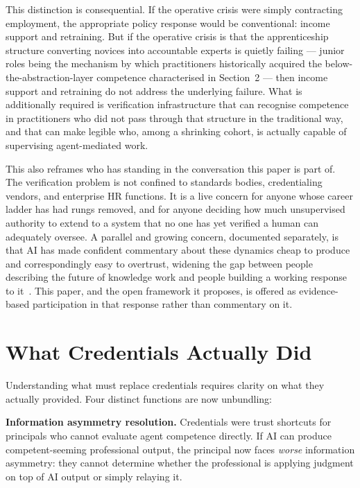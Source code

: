 \documentclass[11pt,a4paper]{article}
\begin{document}
This distinction is consequential. If the operative crisis were simply contracting employment, the
appropriate policy response would be conventional: income support and retraining. But if the
operative crisis is that the apprenticeship structure converting novices into accountable experts is
quietly failing — junior roles being the mechanism by which practitioners historically acquired the
below-the-abstraction-layer competence characterised in Section~2 — then income support and
retraining do not address the underlying failure. What is additionally required is verification
infrastructure that can recognise competence in practitioners who did not pass through that
structure in the traditional way, and that can make legible who, among a shrinking cohort, is
actually capable of supervising agent-mediated work.

This also reframes who has standing in the conversation this paper is part of. The verification
problem is not confined to standards bodies, credentialing vendors, and enterprise HR functions. It
is a live concern for anyone whose career ladder has had rungs removed, and for anyone deciding how
much unsupervised authority to extend to a system that no one has yet verified a human can
adequately oversee. A parallel and growing concern, documented separately, is that AI has made
confident commentary about these dynamics cheap to produce and correspondingly easy to overtrust,
widening the gap between people describing the future of knowledge work and people building a
working response to it~\cite{hbr2026}. This paper, and the open framework it proposes, is offered as
evidence-based participation in that response rather than commentary on it.

\section{What Credentials Actually Did}

Understanding what must replace credentials requires clarity on what they actually provided. Four
distinct functions are now unbundling:

\textbf{Information asymmetry resolution.} Credentials were trust shortcuts for principals who
cannot evaluate agent competence directly. If AI can produce competent-seeming professional output,
the principal now faces \emph{worse} information asymmetry: they cannot determine whether the
professional is applying judgment on top of AI output or simply relaying it.
\end{document}

